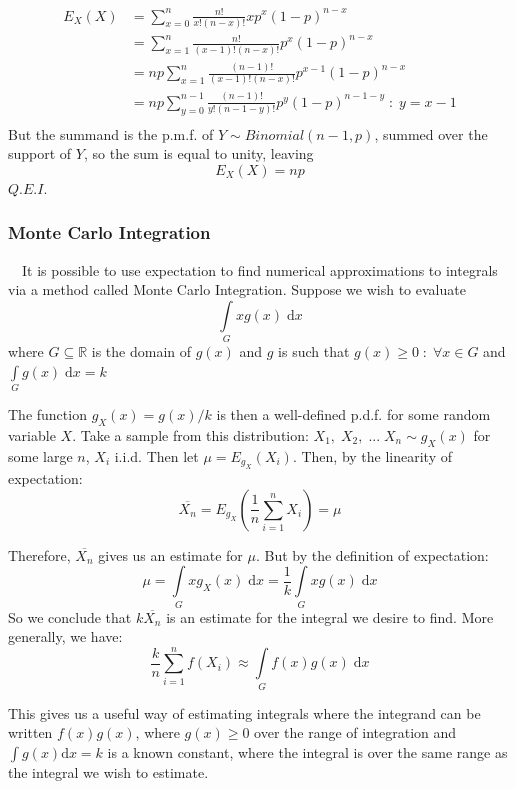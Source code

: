 \documentclass[12pt,a4paper]{article}
\begin{document}
\begin{align*}
E_{X}(X) &= \sum_{x = 0}^n \frac{n!}{x! (n - x)!} x p^x (1 - p)^{n - x}\\
&= \sum_{x = 1}^n \frac{n!}{(x - 1)! (n - x)!} p^x (1 - p)^{n - x}\\
&= np \sum_{x = 1}^n \frac{(n - 1)!}{(x - 1)! (n - x)!}p^{x - 1} (1 - p)^{n - x}\\
&= np \sum_{y = 0}^{n - 1} \frac{(n - 1)!}{y! (n - 1 - y)!} p^y (1 - p)^{n - 1 - y} \; : \; y = x - 1\\
\end{align*}
But the summand is the p.m.f. of $Y \sim Binomial(n - 1, p)$, summed over the support of $Y$, so the sum is equal to unity, leaving
$$E_{X}(X) = np$$
\hfill $Q.E.I.$

\subsubsection{Monte Carlo Integration}

$\quad$It is possible to use expectation to find numerical approximations to integrals via a method called Monte Carlo Integration. Suppose we wish to evaluate
$$\int\limits_{G}\!\!x g(x)\; \mathrm{d}x$$
where $G \subseteq \mathbb{R}$ is the domain of $g(x)$ and $g$ is such that $g(x) \geq 0 \; : \; \forall x \in G$ and $\int\limits_G\!\! g(x)\;\mathrm{d}x = k$

The function $g_X(x) = g(x)/k$ is then a well-defined p.d.f. for some random variable $X$. Take a sample from this distribution: $X_1, \; X_2, \; ... \; X_n \sim g_X(x)$ for some large $n$, $X_i$ i.i.d. Then let $\mu = E_{g_X}(X_i)$. Then, by the linearity of expectation:
$$\overline{X_n} = E_{g_X}(\frac{1}{n}\sum_{i = 1}^n X_i) = \mu$$

\noindent Therefore, $\overline{X_n}$ gives us an estimate for $\mu$. But by the definition of expectation:
$$\mu = \int\limits_G \!\!xg_X(x)\; \mathrm{d}x = \frac{1}{k}\int\limits_G \!\!xg(x)\;\mathrm{d}x$$
So we conclude that $k\overline{X_n}$ is an estimate for the integral we desire to find. More generally, we have:
$$\frac{k}{n} \sum_{i=1}^n f(X_i) \approx \int\limits_G \!\!f(x)g(x)\;\mathrm{d}x$$

This gives us a useful way of estimating integrals where the integrand can be written $f(x)g(x)$, where $g(x) \geq 0$ over the range of integration and $\int g(x)\mathrm{d}x = k$ is a known constant, where the integral is over the same range as the integral we wish to estimate.
\end{document}
